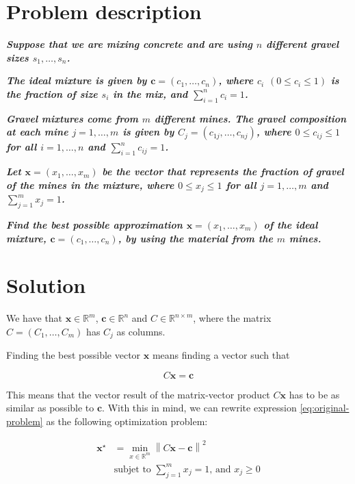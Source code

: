 \documentclass[11pt,a4paper]{article}
\newcommand{\norm}[1]{\left\lVert#1\right\rVert}
\newcommand{\algebraVector}[1]{\boldsymbol{#1}}
\begin{document}
\setlength{\parskip}{1em}

\section{Problem description}

\emph{\textbf{Suppose that we are mixing concrete and are using $n$ different gravel sizes
$s_1, \dots, s_n$.}}

\emph{\textbf{The ideal mixture is given by $\algebraVector{c} = (c_1, \dots, c_n)$, where
$c_i$ $(0 \leq c_i \leq 1)$ is the fraction of size $s_i$ in the mix, and $\sum_{i=1}^n c_i = 1$.}}

\emph{\textbf{Gravel mixtures come from $m$ different mines. The gravel
composition at each mine $j = 1, \dots, m$ is given by $C_j = (c_{1j}, \dots, c_{nj})$, where
$0 \leq c_{ij} \leq 1$ for all $i = 1, \dots, n$ and $\sum_{i=1}^n c_{ij} = 1$.}}

\emph{\textbf{Let $\algebraVector{x} = (x_1, \dots, x_m)$ be the vector that represents the
fraction of gravel of the mines in the mixture, where $0 \leq x_j \leq 1$ for all
$j = 1, \dots, m$ and $\sum_{j=1}^m x_j = 1$.}}

\emph{\textbf{Find the best possible approximation $\algebraVector{x} = (x_1, \dots, x_m)$
of the ideal mixture, $\algebraVector{c} = (c_1, \dots, c_n)$, by using the material from
the $m$ mines.}}

\section{Solution}

We have that $\algebraVector{x} \in \mathbb{R}^m$, $\algebraVector{c} \in \mathbb{R}^n$ and
$C \in \mathbb{R}^{n \times m}$, where the matrix $C = (C_1, \dots, C_m)$ has $C_j$ as columns.

Finding the best possible vector $\algebraVector{x}$ means finding a vector such that

\begin{equation}
  \label{eq:original-problem}
  C\algebraVector{x} = \algebraVector{c}
\end{equation}

This means that the vector result of the matrix-vector product $C\algebraVector{x}$ has to be
as similar as possible to $\algebraVector{c}$. With this in mind, we can rewrite expression
\eqref{eq:original-problem} as the following optimization problem:

\begin{subequations}
\begin{alignat}{2}
  \algebraVector{x}^\star &= \min_{x \in \mathbb{R}^m} \norm{C\algebraVector{x} - \algebraVector{c}}^2 \label{eq:minimization-problem} \\
  &\text{subjet to } \sum_{j=1}^m x_j = 1 \text{, and } x_j \geq 0 \label{eq:restrictions}
\end{alignat}
\end{subequations}
\end{document}

